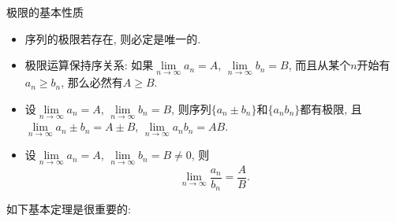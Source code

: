 \begin{theorem}{极限的基本性质}
\begin{itemize}
\item 序列的极限若存在, 则必定是唯一的.
\item 极限运算保持序关系: 如果$\lim\limits_{n\to\infty}a_n=A$, $\lim\limits_{n\to\infty}b_n=B$, 而且从某个$n$开始有$a_n\geq b_n$, 那么必然有$A\geq B$.
\item 设$\lim\limits_{n\to\infty}a_n=A$, $\lim\limits_{n\to\infty}b_n=B$, 则序列$\{a_n\pm b_n\}$和$\{a_n b_n\}$都有极限, 且$\lim\limits_{n\to\infty}a_n\pm b_n=A\pm B$, $\lim\limits_{n\to\infty}a_nb_n=AB$.
\item 设$\lim\limits_{n\to\infty}a_n=A$, $\lim\limits_{n\to\infty}b_n=B\neq0$, 则
$$
\lim\limits_{n\to\infty}\frac{a_n}{b_n}=\frac{A}{B}.
$$
\end{itemize}
\end{theorem}

如下基本定理是很重要的:
